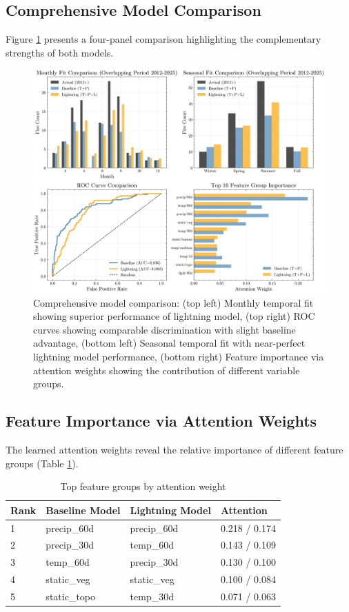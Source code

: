 \documentclass[11pt,a4paper]{article}
\begin{document}
\subsection{Comprehensive Model Comparison}

Figure \ref{fig:model_comparison} presents a four-panel comparison highlighting the complementary strengths of both models.

\begin{figure}[H]
\centering
\includegraphics[width=\textwidth]{../output/figures/model_comparison.png}
\caption{Comprehensive model comparison: (top left) Monthly temporal fit showing superior performance of lightning model, (top right) ROC curves showing comparable discrimination with slight baseline advantage, (bottom left) Seasonal temporal fit with near-perfect lightning model performance, (bottom right) Feature importance via attention weights showing the contribution of different variable groups.}
\label{fig:model_comparison}
\end{figure}

\subsection{Feature Importance via Attention Weights}

The learned attention weights reveal the relative importance of different feature groups (Table \ref{tab:attention}).

\begin{table}[H]
\centering
\caption{Top feature groups by attention weight}
\label{tab:attention}
\begin{tabular}{llll}
\toprule
\textbf{Rank} & \textbf{Baseline Model} & \textbf{Lightning Model} & \textbf{Attention} \\
\midrule
1 & precip\_60d & precip\_60d & 0.218 / 0.174 \\
2 & precip\_30d & temp\_60d & 0.143 / 0.109 \\
3 & temp\_60d & precip\_30d & 0.130 / 0.100 \\
4 & static\_veg & static\_veg & 0.100 / 0.084 \\
5 & static\_topo & temp\_30d & 0.071 / 0.063 \\
\bottomrule
\end{tabular}
\end{table}
\end{document}
